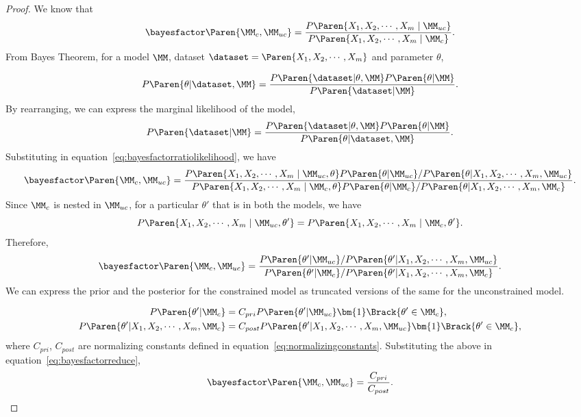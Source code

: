 \begin{proof}
    We know that 
    \begin{equation}\label{eq:bayesfactorratiolikelihood}
        \bayesfactor\Paren{\MM_{c},\MM_{uc}} = \frac{P\Paren{X_1,X_2,\cdots, X_m \mid \MM_{uc}}}{P\Paren{X_1,X_2,\cdots, X_m \mid \MM_c}}.
    \end{equation}
From Bayes Theorem, for a model $\MM$, dataset $\dataset = \Paren{X_1,X_2,\cdots, X_m}$ and parameter $\theta$,

\begin{equation*}
    P\Paren{\theta | \dataset, \MM} = \frac{P\Paren{\dataset|\theta,\MM}P\Paren{\theta|\MM}}{P\Paren{\dataset|\MM}}.
\end{equation*}
    By rearranging, we can express the marginal likelihood of the model, 
\begin{equation*}
    P\Paren{\dataset|\MM} =  \frac{P\Paren{\dataset|\theta,\MM}P\Paren{\theta|\MM}}{P\Paren{\theta | \dataset, \MM}}.
\end{equation*}
Substituting in equation~\ref{eq:bayesfactorratiolikelihood}, we have 
    \begin{equation}\label{eq:bayesfactorsub}
        \bayesfactor\Paren{\MM_{c},\MM_{uc}} = \frac{P\Paren{X_1,X_2,\cdots, X_m \mid \MM_{uc},\theta} P\Paren{\theta|\MM_{uc}}/P\Paren{\theta|X_1,X_2,\cdots, X_m, \MM_{uc}}}{P\Paren{X_1,X_2,\cdots, X_m \mid \MM_{c},\theta} P\Paren{\theta|\MM_{c}}/P\Paren{\theta|X_1,X_2,\cdots, X_m, \MM_{c}}}.
    \end{equation}
Since $\MM_{c}$ is nested in $\MM_{uc}$, for a particular $\theta'$ that is in both the models, we have
\begin{equation*}
    P\Paren{X_1,X_2,\cdots, X_m \mid \MM_{uc},\theta'} = P\Paren{X_1,X_2,\cdots, X_m \mid \MM_{c},\theta'}.
\end{equation*}
 Therefore,
\begin{equation}\label{eq:bayesfactorreduce}
        \bayesfactor\Paren{\MM_{c},\MM_{uc}} = \frac{P\Paren{\theta'|\MM_{uc}}/P\Paren{\theta'|X_1,X_2,\cdots, X_m, \MM_{uc}}}{ P\Paren{\theta'|\MM_{c}}/P\Paren{\theta'|X_1,X_2,\cdots, X_m, \MM_{c}}}.
    \end{equation}
We can express the prior and the posterior for the constrained model as truncated versions of the same for the unconstrained model. 

\begin{align*}
    P\Paren{\theta'|\MM_{c}} &= C_{pri} P\Paren{\theta'|\MM_{uc}}\bm{1}\Brack{\theta' \in \MM_{c}},\\
    P\Paren{\theta'|X_1,X_2,\cdots, X_m, \MM_{c}} &= C_{post}P\Paren{\theta'|X_1,X_2,\cdots, X_m, \MM_{uc}}\bm{1}\Brack{\theta' \in \MM_{c}},
\end{align*}
where $C_{pri}$, $C_{post}$ are normalizing constants defined in equation~\ref{eq:normalizingconstants}. 
Substituting the above in equation~\ref{eq:bayesfactorreduce}, 
\begin{equation}\label{eq:bayesfactorfinal}
        \bayesfactor\Paren{\MM_{c},\MM_{uc}} = \frac{C_{pri}}{C_{post}}.
    \end{equation}
\end{proof}

